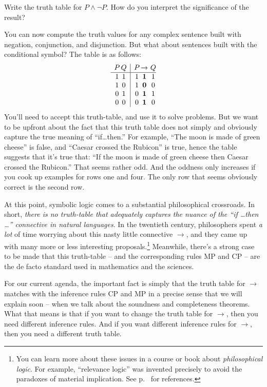 \begin{exercise} Write the truth table for $P\wedge\neg P$.  How do
  you interpret the significance of the result? \end{exercise}



You can now compute the truth values for any complex sentence built
with negation, conjunction, and disjunction.  But what about sentences
built with the conditional symbol? The table is as follows:
\[ \begin{array}{ c@{\, }c | c@{\, }c@{\, }@{\, }c@{ }@{ }c@{ }@{ }c}
P & Q &  P & \to  & Q & \\
\hline 
1 & 1  & 1 & \mathbf{1} & 1 & \\
1 & 0  & 1 & \mathbf{0} & 0 & \\
0 & 1  & 0 & \mathbf{1} & 1 & \\
0 & 0  & 0 & \mathbf{1} & 0 & \\
   \end{array} \]
 You'll need to accept this truth-table, and use it to solve
 problems.  But we want to be upfront about the fact that this truth
 table does not simply and obviously capture the true meaning of
 ``if\dots then.''  For example, ``The moon is made of green cheese'' is
 false, and ``Caesar crossed the Rubicon'' is true, hence the table
 suggests that it's true that: ``If the moon is made of green cheese
 then Caesar crossed the Rubicon.''  That seems rather odd.  And the
 oddness only increases if you cook up examples for rows one and
 four.  The only row that seems obviously correct is the second row.
 
 At this point, symbolic logic comes to a substantial philosophical
 crossroads.  In short, {\it there is no truth-table that adequately
   captures the nuance of the ``if \dots then \dots '' connective in
   natural languages}.  In the twentieth century, philosophers spent
 {\it a lot} of time worrying about this nasty little connective
 $\to$, and they came up with many more or less interesting
 proposals.\footnote{You can learn more about these issues in a course
   or book about \emph{philosophical logic}.  For example, ``relevance
   logic'' was invented precisely to avoid the paradoxes of material
   implication. See p.\ \pageref{relevant} for references.} Meanwhile,
 there's a strong case to be made that this truth-table -- and the
 corresponding rules MP and CP -- are the de facto standard used in
 mathematics and the sciences.

For our current agenda, the important fact is simply that the truth
table for $\to$ matches with the inference rules CP and MP in a
precise sense that we will explain soon -- when we talk about the
soundness and completeness theorems.  What that means is that if you
want to change the truth table for $\to$, then you need different
inference rules.  And if you want different inference rules for $\to$,
then you need a different truth table.

